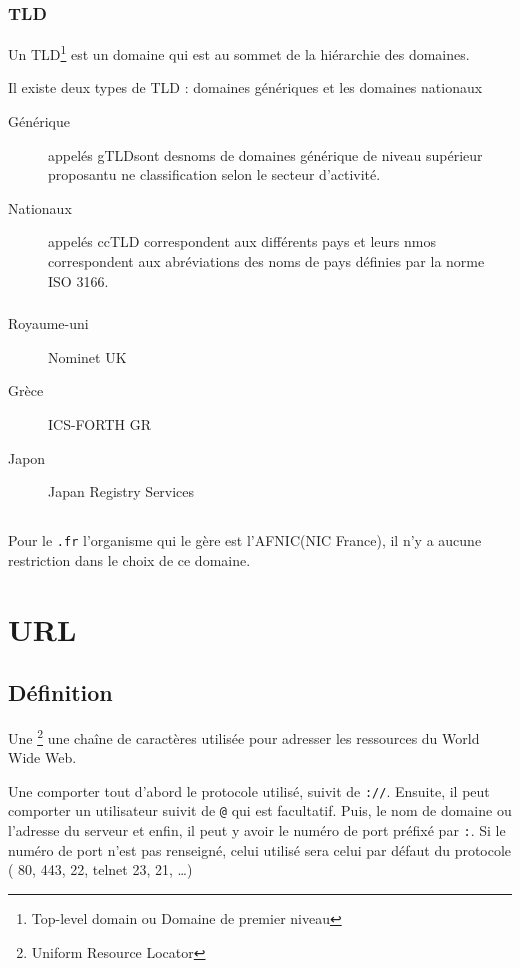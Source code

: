 \documentclass[a4paper, 11pt]{article}
\newcommand{\http}{\bsc{http}}
\newcommand{\url}{\bsc{url}}
\newcommand{\ssh}{\bsc{ssh}}
\newcommand{\https}{\bsc{https}}
\newcommand{\ip}{\bsc{ip}}
\newcommand{\ftp}{\bsc{ftp}}
\begin{document}
	\subsubsection{TLD}
	Un TLD\footnote{Top-level domain ou Domaine de premier niveau} est un domaine qui est au sommet de la hiérarchie des domaines. 

	Il existe deux types de TLD : domaines génériques et les domaines nationaux
	\begin{description}
		\item[Générique]appelés gTLDsont desnoms de domaines générique de niveau supérieur proposantu ne classification selon le secteur d'activité.
		\item[Nationaux] appelés ccTLD correspondent aux différents pays et leurs nmos correspondent aux abréviations des noms de pays définies par la
			norme ISO 3166.
	\end{description}
	\subsubsection{}
\begin{description}
	\item[Royaume-uni] Nominet UK
	\item[Grèce]ICS-FORTH GR
	\item[Japon] Japan Registry Services 
\end{description}
	\subsection{}
	Pour le \texttt{.fr} l'organisme qui le gère est l'AFNIC(NIC France), il n'y a aucune restriction dans le choix de ce domaine.

	\section{URL}
	\subsection{Définition}
	Une \url{}\footnote{Uniform Resource Locator} une chaîne de caractères utilisée pour adresser les ressources du World Wide Web.

	Une \url comporter tout d'abord le protocole utilisé, suivit de \texttt{://}. Ensuite, il peut comporter un utilisateur suivit de \texttt{@} qui est
	facultatif. Puis, le nom de domaine ou l'adresse \ip du serveur et enfin, il peut y avoir le numéro de port préfixé par \texttt{:}. Si le numéro de
	port n'est pas renseigné, celui utilisé sera celui par défaut du protocole (\http{} 80, \https{} 443, \ssh{} 22, telnet 23, \ftp{} 21, \ldots)
\end{document}
